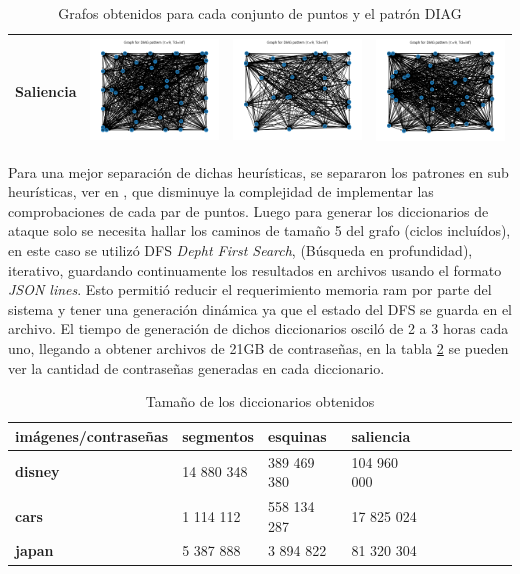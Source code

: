 \begin{table}[H]
\begin{tabular}{|c|c|c|c|}
		Saliencia & \includegraphics[width=3.5cm]{Graphics/disney-saliency-graph.png} 
		& \includegraphics[width=3.5cm]{Graphics/cars-saliency-graph.png} 
		& \includegraphics[width=3.5cm]{Graphics/japan-saliency-graph.png} \\ \hline
	\end{tabular}
	\caption{Grafos obtenidos para cada conjunto de puntos y el patr\'on DIAG}
	\label{graphs}
\end{table}


Para una mejor separaci\'on de dichas heur\'isticas, se separaron los patrones en sub heur\'isticas, ver en \cite{van2010purely}, que disminuye la complejidad de implementar las comprobaciones de cada par de puntos. Luego para generar los diccionarios de ataque solo se necesita hallar los caminos de tama\~no 5 del grafo (ciclos inclu\'idos), en este caso se utiliz\'o DFS \textit{Depht First Search}, (B\'usqueda en profundidad), iterativo, guardando continuamente los resultados en archivos usando el formato \textit{JSON lines}. Esto permiti\'o reducir el requerimiento memoria ram por parte del sistema y tener una generaci\'on  din\'amica ya que el estado del DFS se guarda en el archivo. El tiempo de generaci\'on de dichos diccionarios oscil\'o de 2 a 3 horas cada uno, llegando a obtener archivos de 21GB de contrase\~nas, en la tabla \ref{dictionary:lengths} se pueden ver la cantidad de contrase\~nas generadas en cada diccionario.  

\begin{table}[H]
	\centering
	\caption{Tama\~no de los diccionarios obtenidos}
	\label{dictionary:lengths}
	\begin{tabular}{|l|l|l|l|l|l|l|l|l|l|}
		\hline
		\textbf{im\'agenes/contrase\~nas} & \textbf{segmentos} & \textbf{esquinas} & \textbf{saliencia }  \\ \hline
		\textbf{disney} & 14 880 348 & 389 469 380 & 104 960 000  \\ \hline
		\textbf{cars} & 1 114 112 & 558 134 287 & 17 825 024  \\ \hline
		\textbf{japan} & 5 387 888 & 3 894 822 & 81 320 304 \\ \hline
	\end{tabular}
\end{table}


